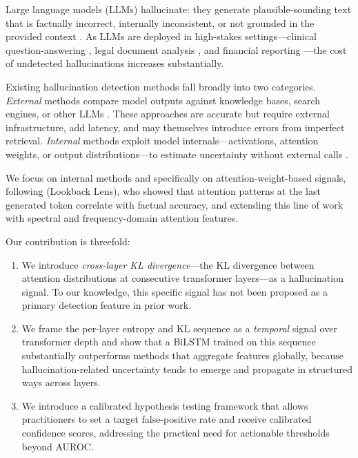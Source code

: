 \documentclass[11pt]{article}
\begin{document}
Large language models (LLMs) hallucinate: they generate plausible-sounding text 
that is factually incorrect, internally inconsistent, or not grounded in the 
provided context \citep{ji2023survey, bang2023multitask}.
As LLMs are deployed in high-stakes settings—clinical question-answering 
\citep{singhal2023large}, legal document analysis \citep{nay2023large}, 
and financial reporting \citep{shah2022flue}—the cost of undetected 
hallucinations increases substantially.

Existing hallucination detection methods fall broadly into two categories. 
\emph{External} methods compare model outputs against knowledge bases, 
search engines, or other LLMs \citep{gou2023critic, chern2023factool}. 
These approaches are accurate but require external infrastructure, add latency, 
and may themselves introduce errors from imperfect retrieval.
\emph{Internal} methods exploit model internals—activations, attention weights, 
or output distributions—to estimate uncertainty without external calls 
\citep{kadavath2022language, kuhn2023semantic, chuang2023dola}.

We focus on internal methods and specifically on attention-weight-based signals,
following \citet{chuang2024lookback} (Lookback Lens), who showed that attention
patterns at the last generated token correlate with factual accuracy, and
extending this line of work with spectral \citep{binkowski2025spectral} and
frequency-domain \citep{qi2026frequency} attention features.

Our contribution is threefold:
\begin{enumerate}
  \item We introduce \emph{cross-layer KL divergence}—the KL divergence 
    between attention distributions at consecutive transformer layers—as 
    a hallucination signal. To our knowledge, this specific signal has not 
    been proposed as a primary detection feature in prior work.

  \item We frame the per-layer entropy and KL sequence as a \emph{temporal} 
    signal over transformer depth and show that a BiLSTM trained on this 
    sequence substantially outperforms methods that aggregate features globally, 
    because hallucination-related uncertainty tends to emerge and propagate 
    in structured ways across layers.

  \item We introduce a calibrated hypothesis testing framework that allows 
    practitioners to set a target false-positive rate and receive calibrated 
    confidence scores, addressing the practical need for actionable thresholds 
    beyond AUROC.
\end{enumerate}
\end{document}
